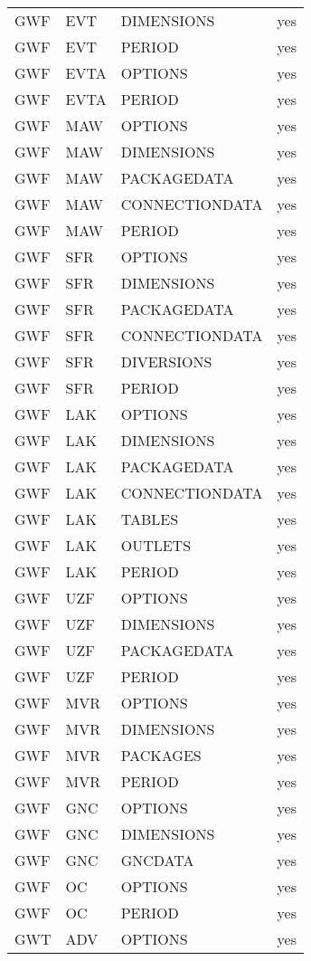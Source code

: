 \begin{longtable}{p{1.5cm} p{1.5cm} p{3cm} c}
GWF & EVT & DIMENSIONS & yes \\ 
GWF & EVT & PERIOD & yes \\ 
\hline
GWF & EVTA & OPTIONS & yes \\ 
GWF & EVTA & PERIOD & yes \\ 
\hline
GWF & MAW & OPTIONS & yes \\ 
GWF & MAW & DIMENSIONS & yes \\ 
GWF & MAW & PACKAGEDATA & yes \\ 
GWF & MAW & CONNECTIONDATA & yes \\ 
GWF & MAW & PERIOD & yes \\ 
\hline
GWF & SFR & OPTIONS & yes \\ 
GWF & SFR & DIMENSIONS & yes \\ 
GWF & SFR & PACKAGEDATA & yes \\ 
GWF & SFR & CONNECTIONDATA & yes \\ 
GWF & SFR & DIVERSIONS & yes \\ 
GWF & SFR & PERIOD & yes \\ 
\hline
GWF & LAK & OPTIONS & yes \\ 
GWF & LAK & DIMENSIONS & yes \\ 
GWF & LAK & PACKAGEDATA & yes \\ 
GWF & LAK & CONNECTIONDATA & yes \\ 
GWF & LAK & TABLES & yes \\ 
GWF & LAK & OUTLETS & yes \\ 
GWF & LAK & PERIOD & yes \\ 
\hline
GWF & UZF & OPTIONS & yes \\ 
GWF & UZF & DIMENSIONS & yes \\ 
GWF & UZF & PACKAGEDATA & yes \\ 
GWF & UZF & PERIOD & yes \\ 
\hline
GWF & MVR & OPTIONS & yes \\ 
GWF & MVR & DIMENSIONS & yes \\ 
GWF & MVR & PACKAGES & yes \\ 
GWF & MVR & PERIOD & yes \\ 
\hline
GWF & GNC & OPTIONS & yes \\ 
GWF & GNC & DIMENSIONS & yes \\ 
GWF & GNC & GNCDATA & yes \\ 
\hline
GWF & OC & OPTIONS & yes \\ 
GWF & OC & PERIOD & yes \\ 
\hline
GWT & ADV & OPTIONS & yes \\ 

\end{longtable}
